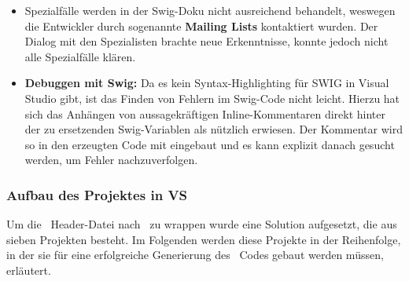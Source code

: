 \begin{itemize}
\begin{itemize}
	\end{itemize}
\item Spezialfälle werden in der Swig-Doku nicht ausreichend behandelt, weswegen die Entwickler durch sogenannte \textbf{Mailing Lists} kontaktiert wurden. Der Dialog mit den Spezialisten brachte neue Erkenntnisse, konnte jedoch nicht alle Spezialfälle klären. %
\item \textbf{Debuggen mit Swig:} Da es kein Syntax-Highlighting für SWIG in Visual Studio gibt, ist das Finden von Fehlern im Swig-Code nicht leicht. Hierzu hat sich das Anhängen von aussagekräftigen Inline-Kommentaren direkt hinter der zu ersetzenden Swig-Variablen als nützlich erwiesen. Der Kommentar wird so in den erzeugten Code mit eingebaut und es kann explizit danach gesucht werden, um Fehler nachzuverfolgen.
\end{itemize}

\subsubsection{Aufbau des Projektes in VS}\label{subsubsec:Aufbau}

Um die \CC~Header-Datei nach \CS~zu wrappen wurde eine Solution aufgesetzt, die aus sieben Projekten besteht. Im Folgenden werden diese Projekte in der Reihenfolge, in der sie für eine erfolgreiche Generierung des \CS~Codes gebaut werden müssen, erläutert.\\

